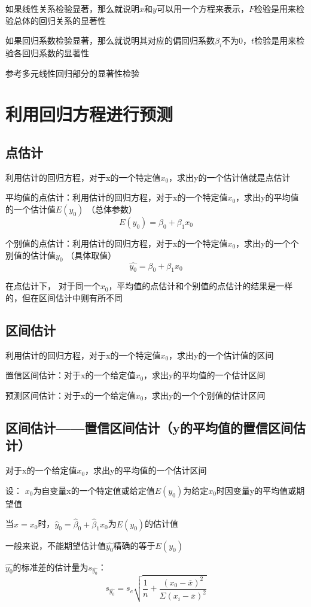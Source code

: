 \documentclass[UTF8,10pt]{book}
\begin{document}
{{如果线性关系检验显著，那么就说明$x$和$y$可以用一个方程来表示，$F$检验是用来检验总体的回归关系的显著性

如果回归系数检验显著，那么就说明其对应的偏回归系数$\beta_i$不为$0$，$t$检验是用来检验各回归系数的显著性
}

参考多元线性回归部分的显著性检验


\section{利用回归方程进行预测}

\subsection{点估计}	
利用估计的回归方程，对于x的一个特定值$x_0$，求出y的一个估计值就是点估计 

平均值的点估计：利用估计的回归方程，对于x的一个特定值$x_0$，求出y的平均值的一个估计值$E(y_0)$ （总体参数） 
$$E(y_0) = \beta_0 + \beta_1 x_0 $$

个别值的点估计：利用估计的回归方程，对于x的一个特定值$x_0$，求出y的一个个别值的估计值$y_0$ （具体取值） 
$$\hat{y_0} = \beta_0 + \beta_1 x_0 $$ 

在点估计下， 对于同一个$x_0$，平均值的点估计和个别值的点估计的结果是一样的，但在区间估计中则有所不同

\subsection{区间估计}	
利用估计的回归方程，对于x的一个特定值$x_0$，求出y的一个估计值的区间 

置信区间估计：对于x的一个给定值$x_0$，求出y的平均值的一个估计区间

预测区间估计：对于x的一个给定值$x_0$，求出y的一个个别值的估计区间

\subsection{区间估计——置信区间估计（y的平均值的置信区间估计）}	
对于x的一个给定值$x_0$，求出y的平均值的一个估计区间 

设： $x_0$为自变量x的一个特定值或给定值$E(y_0)$为给定$x_0$时因变量y的平均值或期望值

当$x=x_0$时，$\hat{y}_0 = \hat{\beta}_0+\hat{\beta}_1 x_0$为$E(y_0)$的估计值 

一般来说，不能期望估计值$\hat{y_0}$精确的等于$E(y_0)$ 

$\hat{y_0}$的标准差的估计量为$s_{\hat{y_0}}$： 
$$ s_{\hat{y_0}} = s_e \sqrt{\frac{1}{n} + \frac{(x_0 - \overline{x})^2}{\Sigma (x_i - \overline{x})^2}} $$ 

}
\end{document}
